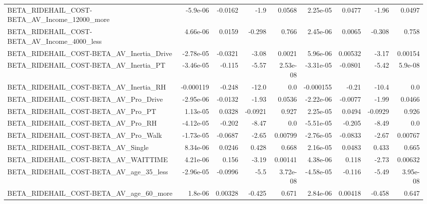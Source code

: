 \begin{tabular}{lrrrrrrrr}
BETA\_RIDEHAIL\_COST-BETA\_AV\_Income\_12000\_more       &    -5.9e-06 &      -0.0162 &     -1.9 &   0.0568 &   2.25e-05 &      0.0477 &        -1.96 &        0.0497 \\
BETA\_RIDEHAIL\_COST-BETA\_AV\_Income\_4000\_less        &    4.66e-06 &       0.0159 &   -0.298 &    0.766 &   2.45e-06 &      0.0065 &       -0.308 &         0.758 \\
BETA\_RIDEHAIL\_COST-BETA\_AV\_Inertia\_Drive           &   -2.78e-05 &      -0.0321 &    -3.08 &   0.0021 &   5.96e-06 &     0.00532 &        -3.17 &       0.00154 \\
BETA\_RIDEHAIL\_COST-BETA\_AV\_Inertia\_PT              &   -3.46e-05 &       -0.115 &    -5.57 & 2.53e-08 &  -3.31e-05 &     -0.0801 &        -5.42 &       5.9e-08 \\
BETA\_RIDEHAIL\_COST-BETA\_AV\_Inertia\_RH              &   -0.000119 &       -0.248 &    -12.0 &      0.0 &  -0.000155 &       -0.21 &        -10.4 &           0.0 \\
BETA\_RIDEHAIL\_COST-BETA\_AV\_Pro\_Drive               &   -2.95e-06 &      -0.0132 &    -1.93 &   0.0536 &  -2.22e-06 &     -0.0077 &        -1.99 &        0.0466 \\
BETA\_RIDEHAIL\_COST-BETA\_AV\_Pro\_PT                  &    1.13e-05 &       0.0328 &  -0.0921 &    0.927 &   2.25e-05 &      0.0494 &      -0.0929 &         0.926 \\
BETA\_RIDEHAIL\_COST-BETA\_AV\_Pro\_RH                  &   -4.12e-05 &       -0.202 &    -8.47 &      0.0 &  -5.51e-05 &      -0.205 &        -8.49 &           0.0 \\
BETA\_RIDEHAIL\_COST-BETA\_AV\_Pro\_Walk                &   -1.73e-05 &      -0.0687 &    -2.65 &  0.00799 &  -2.76e-05 &     -0.0833 &        -2.67 &       0.00767 \\
BETA\_RIDEHAIL\_COST-BETA\_AV\_Single                  &    8.34e-06 &       0.0246 &    0.428 &    0.668 &   2.16e-05 &      0.0483 &        0.433 &         0.665 \\
BETA\_RIDEHAIL\_COST-BETA\_AV\_WAITTIME                &    4.21e-06 &        0.156 &    -3.19 &  0.00141 &   4.38e-06 &       0.118 &        -2.73 &       0.00632 \\
BETA\_RIDEHAIL\_COST-BETA\_AV\_age\_35\_less             &   -2.96e-05 &      -0.0996 &     -5.5 & 3.72e-08 &  -4.58e-05 &      -0.116 &        -5.49 &      3.95e-08 \\
BETA\_RIDEHAIL\_COST-BETA\_AV\_age\_60\_more             &     1.8e-06 &      0.00328 &   -0.425 &    0.671 &   2.84e-06 &     0.00418 &       -0.458 &         0.647 \\

\end{tabular}
